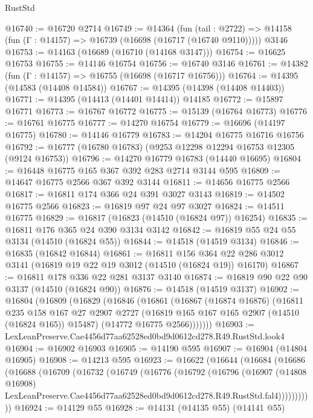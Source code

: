\begin{lexlean}{RustStd}
\begin{coremodule}
@16740 := @16720 @2714
@16749 := @14364
    (fun (tail : @2722) => @14158 (fun (Γ : @14157) => @16739 (@16698 (@16717 (@16740 @9110)))))
    @3146
@16753 := @14163 (@16689 (@16710 (@14168 @3147)))
@16754 := @16625 @16753
@16755 := @14146 @16754
@16756 := @16740 @3146
@16761 := @14382 (fun (Γ : @14157) => @16755 (@16698 (@16717 @16756)))
@16764 := @14395 (@14583 (@14408 @14584))
@16767 := @14395 (@14398 (@14408 @14403))
@16771 := @14395 (@14413 (@14401 @14414)) @14185
@16772 := @15897 @16771
@16773 := @16767 @16772
@16775 := @15139 (@16764 @16773)
@16776 := @16761 @16775
@16777 := @14270 @16754
@16779 := @16696 (@14197 @16775)
@16780 := @14146 @16779
@16783 := @14204 @16775 @16716 @16756
@16792 := @16777 (@16780 @16783) (@9253 @12298 @12294 @16753 @12305 (@9124 @16753))
@16796 := @14270 @16779 @16783 (@14440 @16695)
@16804 := @16448 @16775 @165 @367 @392 @283 @2714 @3144 @595
@16809 := @14647 @16775 @2566 @367 @392 @3144
@16811 := @14656 @16775 @2566
@16817 := @16811 @174 @366 @24 @391 @3027 @3143
@16819 := @14502 @16775 @2566
@16823 := @16819 @97 @24 @97 @3027
@16824 := @14511 @16775
@16829 := @16817 (@16823 (@14510 (@16824 @97)) @16254)
@16835 := @16811 @176 @365 @24 @390 @3134 @3142
@16842 := @16819 @55 @24 @55 @3134 (@14510 (@16824 @55))
@16844 := @14518 (@14519 @3134)
@16846 := @16835 (@16842 @16844)
@16861 := @16811
    @156
    @364
    @22
    @286
    @3012
    @3141
    (@16819 @19 @22 @19 @3012 (@14510 (@16824 @19)) @16170)
@16867 := @16811 @178 @336 @22 @281 @3137 @3140
@16874 := @16819 @90 @22 @90 @3137 (@14510 (@16824 @90))
@16876 := @14518 (@14519 @3137)
@16902 := @16804
    (@16809
      (@16829
        (@16846
          (@16861
            (@16867
              (@16874 @16876)
              (@16811
                @235
                @158
                @167
                @27
                @2907
                @2727
                (@16819 @165 @167 @165 @2907 (@14510 (@16824 @165)) @15487)
                (@14772 @16775 @2566)))))))
@16903 := LexLeanPreserve.Cae4456d77aa62528ed0bd9d0612cd278.R49.RustStd.look4
@16904 := @16902 @16903
@16905 := @14190 @595
@16907 := @16904 (@14804 @16905)
@16908 := @14213 @595
@16923 := @16622
    (@16644
      (@16684
        (@16686
          (@16688
            (@16709
              (@16732
                (@16749
                  (@16776
                    (@16792
                      (@16796
                        (@16907
                          (@14808 @16908)
                          LexLeanPreserve.Cae4456d77aa62528ed0bd9d0612cd278.R49.RustStd.fal4)))))))))))
@16924 := @14129 @55
@16928 := @14131 (@14135 @55) (@14141 @55)

\end{coremodule}
\end{lexlean}
